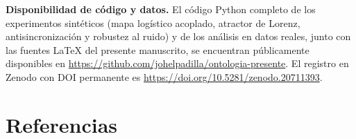 \documentclass[11pt,a4paper]{article}
\begin{document}
\noindent\textbf{Disponibilidad de código y datos.} El código Python completo de los experimentos sintéticos (mapa logístico acoplado, atractor de Lorenz, antisincronización y robustez al ruido) y de los análisis en datos reales, junto con las fuentes LaTeX del presente manuscrito, se encuentran públicamente disponibles en \url{https://github.com/johelpadilla/ontologia-presente}. El registro en Zenodo con DOI permanente es \url{https://doi.org/10.5281/zenodo.20711393}.

\section*{Referencias}

\sloppy

\normalfont
\end{document}
